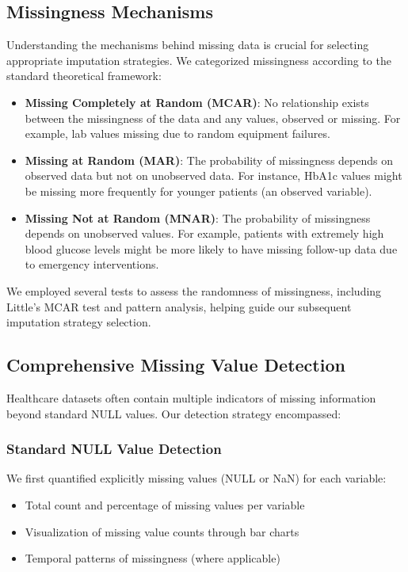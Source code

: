 \subsection{Missingness Mechanisms}
Understanding the mechanisms behind missing data is crucial for selecting appropriate imputation strategies. We categorized missingness according to the standard theoretical framework:

\begin{itemize}
    \item \textbf{Missing Completely at Random (MCAR)}: No relationship exists between the missingness of the data and any values, observed or missing. For example, lab values missing due to random equipment failures.
    
    \item \textbf{Missing at Random (MAR)}: The probability of missingness depends on observed data but not on unobserved data. For instance, HbA1c values might be missing more frequently for younger patients (an observed variable).
    
    \item \textbf{Missing Not at Random (MNAR)}: The probability of missingness depends on unobserved values. For example, patients with extremely high blood glucose levels might be more likely to have missing follow-up data due to emergency interventions.
\end{itemize}

We employed several tests to assess the randomness of missingness, including Little's MCAR test and pattern analysis, helping guide our subsequent imputation strategy selection.

\subsection{Comprehensive Missing Value Detection}
Healthcare datasets often contain multiple indicators of missing information beyond standard NULL values. Our detection strategy encompassed:

\subsubsection{Standard NULL Value Detection}
We first quantified explicitly missing values (NULL or NaN) for each variable:
\begin{itemize}
    \item Total count and percentage of missing values per variable
    \item Visualization of missing value counts through bar charts
    \item Temporal patterns of missingness (where applicable)
\end{itemize}

